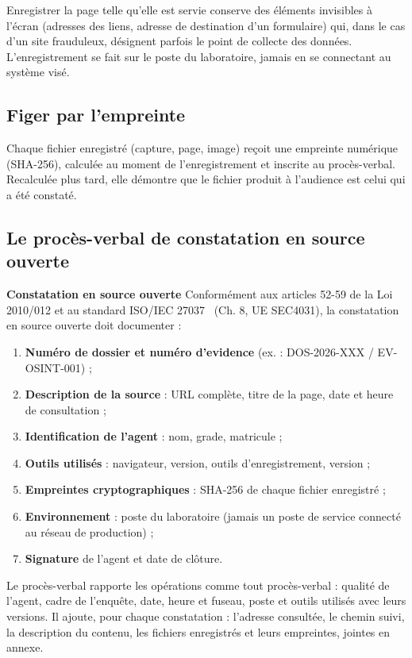 Enregistrer la page telle qu'elle est servie conserve des éléments invisibles à l'écran (adresses des liens, adresse de destination d'un formulaire) qui, dans le cas d'un site frauduleux, désignent parfois le point de collecte des données. L'enregistrement se fait sur le poste du laboratoire, jamais en se connectant au système visé.

\subsection{Figer par l'empreinte}

Chaque fichier enregistré (capture, page, image) reçoit une empreinte numérique (SHA-256), calculée au moment de l'enregistrement et inscrite au procès-verbal. Recalculée plus tard, elle démontre que le fichier produit à l'audience est celui qui a été constaté.

\subsection{Le procès-verbal de constatation en source ouverte}

\begin{boxcustody}
\textbf{Constatation en source ouverte}
Conformément aux articles 52-59 de la Loi 2010/012 et au standard ISO/IEC 27037~\cite{iso27037} (Ch. 8, UE SEC4031), la constatation en source ouverte doit documenter :

\begin{enumerate}
\item \textbf{Numéro de dossier et numéro d'evidence} (ex. : DOS-2026-XXX / EV-OSINT-001) ;
\item \textbf{Description de la source} : URL complète, titre de la page, date et heure de consultation ;
\item \textbf{Identification de l'agent} : nom, grade, matricule ;
\item \textbf{Outils utilisés} : navigateur, version, outils d'enregistrement, version ;
\item \textbf{Empreintes cryptographiques} : SHA-256 de chaque fichier enregistré ;
\item \textbf{Environnement} : poste du laboratoire (jamais un poste de service connecté au réseau de production) ;
\item \textbf{Signature} de l'agent et date de clôture.
\end{enumerate}
\end{boxcustody}

Le procès-verbal rapporte les opérations comme tout procès-verbal : qualité de l'agent, cadre de l'enquête, date, heure et fuseau, poste et outils utilisés avec leurs versions. Il ajoute, pour chaque constatation : l'adresse consultée, le chemin suivi, la description du contenu, les fichiers enregistrés et leurs empreintes, jointes en annexe.

